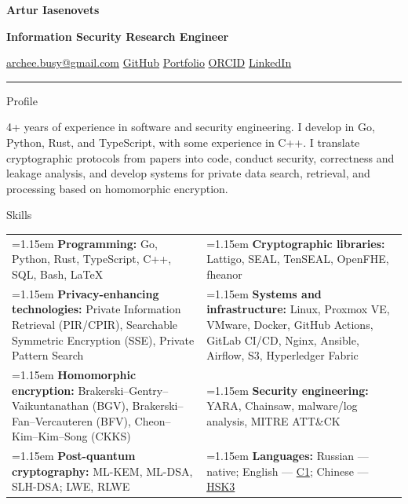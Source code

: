 \documentclass[11pt,a4paper]{article}
\newcommand{\cvrow}[2]{%
  \noindent
  \begin{minipage}[t]{0.145\textwidth}
    \vspace{0pt}%
    \raggedright
    \fontsize{10.5}{12.5}\selectfont
    #1
  \end{minipage}%
  \hfill
  \begin{minipage}[t]{0.835\textwidth}
    \vspace{0pt}%
    #2
  \end{minipage}\par
}
\newcommand{\skillcell}[2]{%
  \noindent
  \hangindent=1.15em
  \hangafter=1
  \makebox[1.15em][l]{$\diamond$}%
  \textbf{#1} #2%
}
\begin{document}
{\fontsize{24}{28}\selectfont\bfseries Artur Iasenovets}\par
\vspace{0.08em}
{\large\bfseries Information Security Research Engineer}\par
\vspace{0.28em}
\href{mailto:archee.busy@gmail.com}{archee.busy@gmail.com}
\;\textbullet\;
\href{https://github.com/iasenovets}{GitHub}
\;\textbullet\;
\href{https://iasenovets.github.io/}{Portfolio}
\;\textbullet\;
\href{https://orcid.org/0009-0008-0008-3746}{ORCID}
\;\textbullet\;
\href{https://linkedin.com/in/iasenovets}{LinkedIn}
\par
\vspace{0.22em}
\hrule
\vspace{0.55em}

\cvrow{Profile}{%
  4+ years of experience in software and security engineering. I develop in Go,
  Python, Rust, and TypeScript, with some experience in C++.
  I translate cryptographic protocols from papers into code, conduct security,
  correctness and leakage analysis, and develop systems for private data search,
  retrieval, and processing based on homomorphic encryption.
}

\vspace{0.75em}

\cvrow{Skills}{%
  \begin{tabularx}{\linewidth}
    {@{}>{\raggedright\arraybackslash}X
    @{\hspace{1.2em}}
    >{\raggedright\arraybackslash}X@{}}

    \skillcell{Programming:}{%
      Go, Python, Rust, TypeScript, C++, SQL, Bash, LaTeX}
    &
    \skillcell{Cryptographic libraries:}{%
      Lattigo, SEAL, TenSEAL, OpenFHE, fheanor}
    \\[0.20em]

    \skillcell{Privacy-enhancing technologies:}{%
      Private Information Retrieval (PIR/CPIR),
      Searchable Symmetric Encryption (SSE),
      Private Pattern Search}
    &
    \skillcell{Systems and infrastructure:}{%
      Linux, Proxmox VE, VMware, Docker,
      GitHub Actions, GitLab CI/CD, Nginx, Ansible,
      Airflow, S3, Hyperledger Fabric}
    \\[0.20em]

    \skillcell{Homomorphic encryption:}{%
      Brakerski--Gentry--Vaikuntanathan (BGV),
      Brakerski--Fan--Vercauteren (BFV),
      Cheon--Kim--Kim--Song (CKKS)}
    &
    \skillcell{Security engineering:}{%
      YARA, Chainsaw, malware/log analysis,
      MITRE ATT\&CK}
    \\[0.20em]

    \skillcell{Post-quantum cryptography:}{%
      ML-KEM, ML-DSA, SLH-DSA; LWE, RLWE}
    &
    \skillcell{Languages:}{%
      Russian --- native;
      English --- \href{https://iasenovets.github.io/files/toefl_8cd5f4a2b8ec8f34da49ea0faeef43f1.pdf}{C1};
      Chinese --- \href{https://admin.chinesetest.cn/queryScore.do?sid=c2tActR9Wb\%2704b861aefbdc5e9fd0b44afa717d08cbceb0720e582ce25f\%2724d7sWsQ5nVUQSwD}{HSK3}}
  \end{tabularx}
}
\end{document}
